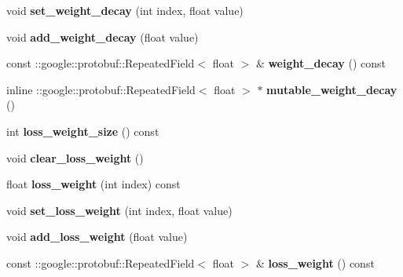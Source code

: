 \begin{DoxyCompactItemize}
void {\bfseries set\+\_\+weight\+\_\+decay} (int index, float value)
\item 
\mbox{\label{classcaffe_1_1_v1_layer_parameter_add7792b4047dfd972307a3d85200fe85}} 
void {\bfseries add\+\_\+weight\+\_\+decay} (float value)
\item 
\mbox{\label{classcaffe_1_1_v1_layer_parameter_a5159bdfd07557e30ca32366da9fed746}} 
const \+::google\+::protobuf\+::\+Repeated\+Field$<$ float $>$ \& {\bfseries weight\+\_\+decay} () const
\item 
\mbox{\label{classcaffe_1_1_v1_layer_parameter_a443421dcb6d535bcc5e49ba79c4a7863}} 
inline \+::google\+::protobuf\+::\+Repeated\+Field$<$ float $>$ $\ast$ {\bfseries mutable\+\_\+weight\+\_\+decay} ()
\item 
\mbox{\label{classcaffe_1_1_v1_layer_parameter_a50d6ef8191c56e618d3657235c6f5741}} 
int {\bfseries loss\+\_\+weight\+\_\+size} () const
\item 
\mbox{\label{classcaffe_1_1_v1_layer_parameter_a6b33bbe354426fd644e5e32c71256fe4}} 
void {\bfseries clear\+\_\+loss\+\_\+weight} ()
\item 
\mbox{\label{classcaffe_1_1_v1_layer_parameter_a2321f971e6df789f416f2d985ac5d177}} 
float {\bfseries loss\+\_\+weight} (int index) const
\item 
\mbox{\label{classcaffe_1_1_v1_layer_parameter_a76391e060875038577a26ffc43134c83}} 
void {\bfseries set\+\_\+loss\+\_\+weight} (int index, float value)
\item 
\mbox{\label{classcaffe_1_1_v1_layer_parameter_a435da107ef90340ba62e732e6034b837}} 
void {\bfseries add\+\_\+loss\+\_\+weight} (float value)
\item 
\mbox{\label{classcaffe_1_1_v1_layer_parameter_a44ed8f0084f4cb3a7aea58a15450d8bb}} 
const \+::google\+::protobuf\+::\+Repeated\+Field$<$ float $>$ \& {\bfseries loss\+\_\+weight} () const

\end{DoxyCompactItemize}
